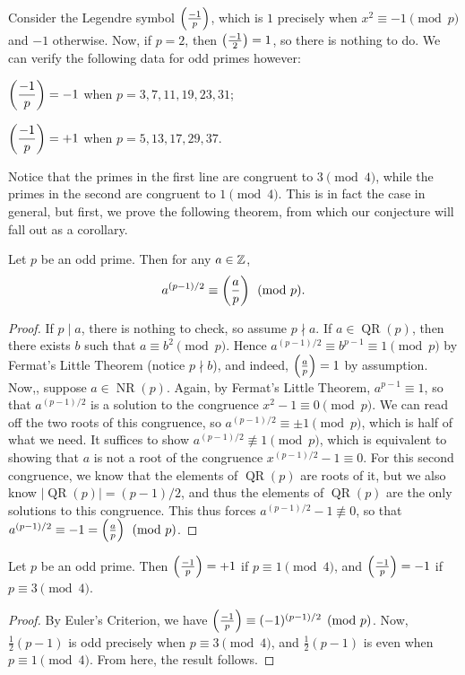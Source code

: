 \documentclass{article}
\newcommand{\leg}[2]{\paren{\frac{#1}{#2}}}
\DeclareMathOperator{\QR}{\mathrm{QR}}
\DeclareMathOperator{\NR}{\mathrm{NR}}
\begin{document}
Consider the Legendre symbol $\leg{-1}p$, which is $1$ precisely when $x^2 \equiv -1 \pmod p$ and $-1$ otherwise. Now, if $p=2$, then $\leg{-1}2 = 1$, so there is nothing to do. We can verify the following data for odd primes however:
\begin{center}
    $\ds\leg{-1}p = -1$ when $p = 3, 7, 11, 19, 23, 31$;
    
    $\ds\leg{-1}p = +1$ when $p = 5, 13, 17, 29, 37$.
\end{center}
Notice that the primes in the first line are congruent to $3\pmod 4$, while the primes in the second are congruent to $1\pmod 4$. This is in fact the case in general, but first, we prove the following theorem, from which our conjecture will fall out as a corollary.
\begin{theorem}
Let $p$ be an odd prime. Then for any $a\in \mathbb Z$, $$a^{(p-1)/2} \equiv \leg ap\pmod p.$$ 
\end{theorem}
\begin{proof}
If $p\mid a$, there is nothing to check, so assume $p\nmid a$. If $a\in \QR(p)$, then there exists $b$ such that $a\equiv b^2\pmod p$. Hence $a^{(p-1)/2} \equiv b^{p-1} \equiv 1\pmod p$ by Fermat's Little Theorem (notice $p\nmid b$), and indeed, $\leg ap = 1$ by assumption. Now,, suppose $a\in \NR(p)$. Again, by Fermat's Little Theorem, $a^{p-1} \equiv 1$, so that $a^{(p-1)/2}$ is a solution to the congruence $x^2 - 1 \equiv 0\pmod p$. We can read off the two roots of this congruence, so $a^{(p-1)/2} \equiv \pm 1\pmod p$, which is half of what we need. It suffices to show $a^{(p-1)/2} \not \equiv 1\pmod p$, which is equivalent to showing that $a$ is not a root of the congruence $x^{(p-1)/2} - 1\equiv 0$. For this second congruence, we know that the elements of $\QR(p)$ are roots of it, but we also know $|\QR(p)| = (p-1)/2$, and thus the elements of $\QR(p)$ are the only solutions to this congruence. This thus forces $a^{(p-1)/2} - 1\not\equiv 0$, so that $a^{(p-1)/2} \equiv -1 =\leg ap \pmod p$.
\end{proof}

\begin{corollary}
Let $p$ be an odd prime. Then $\leg{-1}p  = +1$ if $p\equiv 1\pmod 4$, and $\leg{-1}p = -1$ if $p\equiv 3\pmod 4$.
\end{corollary}
\begin{proof}
By Euler's Criterion, we have $\leg{-1}p \equiv (-1)^{(p-1)/2}\pmod p$. Now, $\frac 12(p-1)$ is odd precisely when $p\equiv 3\pmod 4$, and $\frac 12(p-1)$ is even when $p\equiv 1\pmod 4$. From here, the result follows.
\end{proof}
\end{document}
